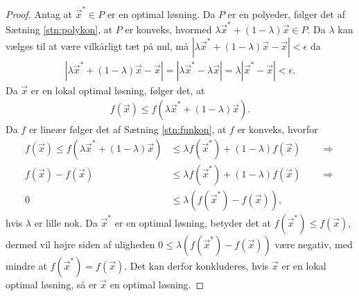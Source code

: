 \begin{proof}
Antag at $\vec{x}^* \in P$ er en optimal løsning.
Da $P$ er en polyeder, følger det af Sætning \ref{stn:polykon}, at $P$ er konveks, hvormed $\lambda \vec{x}^* + (1-\lambda)\vec{x} \in P$. 
Da $\lambda$ kan vælges til at være vilkårligt tæt på nul, må $|\lambda \vec{x}^* + (1-\lambda)\vec{x} - \vec{x}| < \epsilon$ da
\begin{align*}
 |\lambda \vec{x}^* + (1-\lambda)\vec{x} - \vec{x}| = | \lambda \vec{x}^* - \lambda\vec{x}| = \lambda|\vec{x}^* - \vec{x}| < \epsilon.
\end{align*}
Da $\vec{x}$ er en lokal optimal løsning, følger det, at
\begin{align*}
f(\vec{x}) \leq f(\lambda \vec{x}^* + (1-\lambda)\vec{x}).
\end{align*}
Da $f$ er lineær følger det af Sætning \ref{stn:funkon}, at $f$ er konveks, hvorfor
\begin{align*}
f(\vec{x}) \leq f(\lambda \vec{x}^* + (1-\lambda)\vec{x}) &\leq \lambda f(\vec{x}^*) + (1-\lambda)f(\vec{x}) \qquad \Rightarrow
\\ f(\vec{x}) - f(\vec{x}) &\leq \lambda f(\vec{x}^*) + (1-\lambda)f(\vec{x}) \qquad \Rightarrow
\\ 0 & \leq \lambda( f(\vec{x}^*) - f(\vec{x})),
\end{align*}
hvis $\lambda$ er lille nok.
Da $\vec{x}^*$ er en optimal løsning, betyder det at $f(\vec{x}^*) \leq f(\vec{x})$, dermed vil højre siden af uligheden $0 \leq \lambda( f(\vec{x}^*) - f(\vec{x}))$ være negativ, med mindre at $f(\vec{x}^*) =f(\vec{x})$. 
Det kan derfor konkluderes, hvis $\vec{x}$ er en lokal optimal løsning, så er $\vec{x}$ en optimal løsning.
\end{proof}



